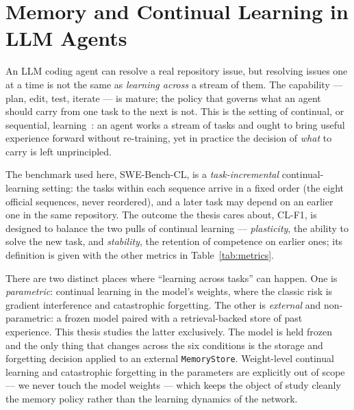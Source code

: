 

\section{Memory and Continual Learning in LLM Agents}

An LLM coding agent can resolve a real repository issue, but resolving issues one at a time
is not the same as \emph{learning across} a stream of them. The capability --- plan, edit,
test, iterate --- is mature; the policy that governs what an agent should carry from one
task to the next is not. This is the setting of continual, or sequential,
learning~\cite{joshi2025}: an agent works a stream of tasks and ought to bring useful
experience forward without re-training, yet in practice the decision of \emph{what} to
carry is left unprincipled.

The benchmark used here, SWE-Bench-CL, is a \emph{task-incremental} continual-learning
setting: the tasks within each sequence arrive in a fixed order (the eight official
sequences, never reordered), and a later task may depend on an earlier one in the same
repository. The outcome the thesis cares about, CL-F1, is designed to balance the two
pulls of continual learning --- \emph{plasticity}, the ability to solve the new task, and
\emph{stability}, the retention of competence on earlier ones; its definition is given
with the other metrics in Table~\ref{tab:metrics}.

There are two distinct places where ``learning across tasks'' can happen. One is
\emph{parametric}: continual learning in the model's weights, where the classic risk is
gradient interference and catastrophic forgetting. The other is \emph{external} and
non-parametric: a frozen model paired with a retrieval-backed store of past experience.
This thesis studies the latter exclusively. The model is held frozen and the only thing
that changes across the six conditions is the storage and forgetting decision applied to
an external \texttt{MemoryStore}. Weight-level continual learning and catastrophic
forgetting in the parameters are explicitly out of scope --- we never touch the model
weights --- which keeps the object of study cleanly the memory policy rather than the
learning dynamics of the network.
